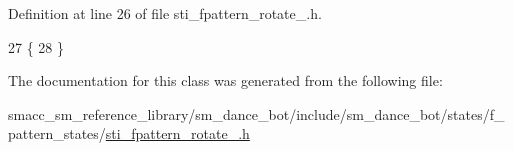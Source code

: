 Definition at line 26 of file sti\+\_\+fpattern\+\_\+rotate\+\_.\+h.


\begin{DoxyCode}
27   \{
28   \}
\end{DoxyCode}


The documentation for this class was generated from the following file\+:\begin{DoxyCompactItemize}
\item 
smacc\+\_\+sm\+\_\+reference\+\_\+library/sm\+\_\+dance\+\_\+bot/include/sm\+\_\+dance\+\_\+bot/states/f\+\_\+pattern\+\_\+states/\hyperlink{sti__fpattern__rotate__2_8h}{sti\+\_\+fpattern\+\_\+rotate\+\_.\+h}\end{DoxyCompactItemize}
